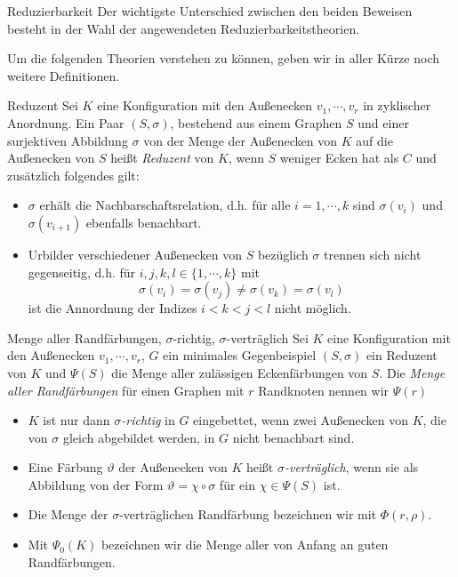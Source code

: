 \begin{section}{Reduzierbarkeit}
 \label{sec:AHRed}
 Der wichtigste Unterschied zwischen den beiden Beweisen besteht in der Wahl der angewendeten Reduzierbarkeitstheorien. 
 
 Um die folgenden Theorien verstehen zu können, geben wir in aller Kürze noch weitere Definitionen.
 
 \begin{definition}{Reduzent}
  Sei $K$ eine Konfiguration mit den Außenecken $v_1,\cdots,v_r$ in zyklischer Anordnung. Ein Paar $(S,\sigma)$, bestehend aus einem Graphen $S$ und einer surjektiven Abbildung $\sigma$ von der Menge der Außenecken von $K$ auf die Außenecken von $S$ heißt \textit{Reduzent} von $K$, wenn $S$ weniger Ecken hat als $C$ und zusätzlich folgendes gilt:
  \begin{itemize}
   \item $\sigma$ erhält die Nachbarschaftsrelation, d.h. für alle $i = 1,\cdots,k$ sind $\sigma(v_i)$ und $\sigma(v_{i+1})$ ebenfalls benachbart.
   \item Urbilder verschiedener Außenecken von $S$ bezüglich $\sigma$ trennen sich nicht gegenseitig, d.h. für $i,j,k,l \in \{1,\cdots,k\}$ mit
   \[ \sigma(v_i) = \sigma(v_j) \neq \sigma(v_k) = \sigma(v_l)\]
   ist die Annordnung der Indizes $i < k < j < l$ nicht möglich.
  \end{itemize}
 \end{definition}
 
 \begin{definition}{Menge aller Randfärbungen, $\sigma$-richtig, $\sigma$-verträglich}
  Sei $K$ eine Konfiguration mit den Außenecken $v_1,\cdots,v_r$, $G$ ein minimales Gegenbeispiel $(S,\sigma)$ ein Reduzent von $K$ und $\Psi(S)$ die Menge aller zulässigen Eckenfärbungen von $S$. Die \textit{Menge aller Randfärbungen} für einen Graphen mit $r$ Randknoten nennen wir $\Psi(r)$
  \begin{itemize}
   \item $K$ ist nur dann \textit{$\sigma$-richtig} in $G$ eingebettet, wenn zwei Außenecken von $K$, die von $\sigma$ gleich abgebildet werden, in $G$ nicht benachbart sind. 
   \item Eine Färbung $\vartheta$ der Außenecken von $K$ heißt \textit{$\sigma$-verträglich}, wenn sie als Abbildung von der Form $\vartheta = \chi \circ \sigma$ für ein $\chi \in \Psi(S)$ ist.
   \item Die Menge der $\sigma$-verträglichen Randfärbung bezeichnen wir mit $\Phi(r,\rho)$.
   \item Mit $\Psi_0(K)$ bezeichnen wir die Menge aller von Anfang an guten Randfärbungen.
  \end{itemize}
 \end{definition}


\end{section}
